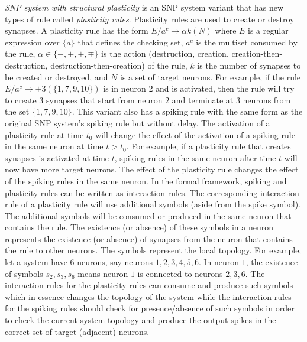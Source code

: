 \documentclass[a4paper]{article}
\theoremstyle{definition}
\newcommand{\ra}{\rightarrow}
\begin{document}
\emph{SNP system with structural plasticity} \cite{cabarle-2015-structural-plasticity} is an SNP
system variant that has new types of rule called \emph{plasticity rules}. Plasticity rules are used
to create or destroy synapses. A plasticity rule has the form $E/a^c \ra \alpha k(N)$ where $E$ is
a regular expression over $\{a\}$ that defines the checking set, $a^c$ is the multiset consumed by
the rule, $\alpha \in \{-,+,\pm, \mp\}$ is the action (destruction, creation,
creation-then-destruction, destruction-then-creation) of the rule, $k$ is the number of synapses to
be created or destroyed, and $N$ is a set of target neurons. For example, if the  rule 
$E/a^c \ra +3(\{1,7,9,10\})$ is in neuron $2$ and is activated, then the rule will try to create $3$ 
synapses that start from neuron $2$ and terminate at $3$ neurons from the set $\{1,7,9,10\}$. This
variant also has a spiking rule with the same form as the original SNP system's spiking rule but 
without delay. The activation of a plasticity rule at time $t_0$ will change the effect of the 
activation of a spiking rule in the same neuron at time $t > t_0$. For example, if a plasticity rule
that creates synapses is activated at time $t$, spiking rules in the same neuron after
time $t$ will now have more target neurons. The effect of the plasticity rule changes the effect of
the spiking rules in the same neuron. In the formal framework, spiking and plasticity rules can be
written as interaction rules. The corresponding interaction rule of a plasticity rule will use 
additional symbols (aside from the spike symbol). The additional symbols will be consumed or 
produced in the same neuron that contains the rule. The existence (or absence) of these symbols in a 
neuron represents the existence (or absence) of synapses from the neuron that contains the rule to
other neurons. The symbols represent the local topology. For example, let a system have 6 neurons,
say neurons $1,2,3,4,5,6$. In neuron $1$, the existence of symbols $s_{2}, s_3, s_6$ means neuron 
$1$ is connected to neurons $2,3,6$. The interaction rules for the plasticity rules can consume and 
produce such symbols which in essence changes the topology of the system while the interaction rules
for the spiking rules should check for presence/absence of such symbols in order to check the
current system topology and produce the output spikes in the correct set of target (adjacent) 
neurons.
\end{document}

